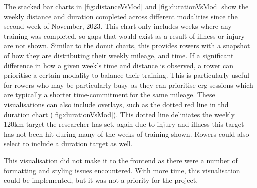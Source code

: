 The stacked bar charts in \autoref{fig:distanceVsMod} and \autoref{fig:durationVsMod} show the weekly distance and duration completed across different modalities since the second week of November, 2023. This chart only includes weeks where any training was completed, so gaps that would exist as a result of illness or injury are not shown. Similar to the donut charts, this provides rowers with a snapshot of how they are distributing their weekly mileage, and time. If a significant difference in how a given week's time and distance is observed, a rower can prioritise a certain modality to balance their training. This is particularly useful for rowers who may be particularly busy, as they can prioritise erg sessions which are typically a shorter time-commitment for the same mileage. These visualisations can also include overlays, such as the dotted red line in thd duration chart (\autoref{fig:durationVsMod}). This dotted line deliniates the weekly 120km target the researcher has set, again due to injury and illness this target has not been hit during many of the weeks of training shown. Rowers could also select to include a duration target as well.

This visualisation did not make it to the frontend as there were a number of formatting and styling issues encountered. With more time, this visualisation could be implemented, but it was not a priority for the project.

